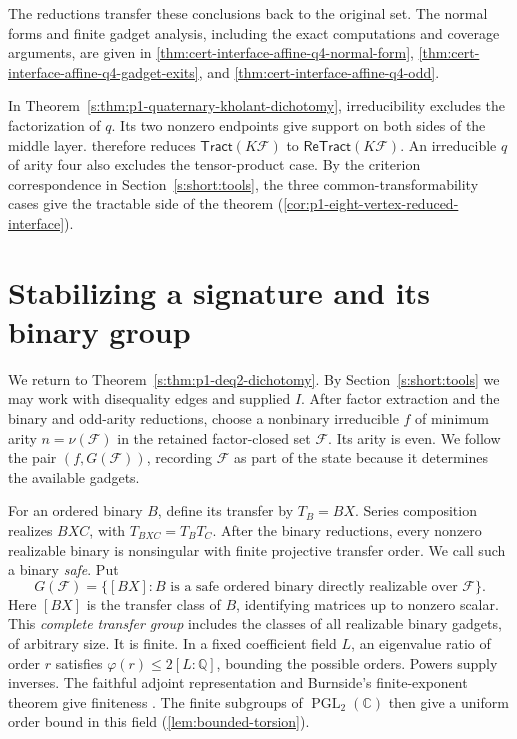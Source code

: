 \documentclass[11pt,letterpaper,onecolumn]{article}
\theoremstyle{plain}
\theoremstyle{definition}
\theoremstyle{remark}
\newcommand{\cF}{\mathcal F}
\newcommand{\Tract}{\mathsf{Tract}}
\newcommand{\ReTract}{\mathsf{ReTract}}
\newcommand{\PGL}{\operatorname{PGL}}
\begin{document}
The reductions transfer these conclusions back to the original set. The normal forms and finite gadget analysis,
including the exact computations and coverage arguments, are given in
\cref{thm:cert-interface-affine-q4-normal-form},
\cref{thm:cert-interface-affine-q4-gadget-exits}, and
\cref{thm:cert-interface-affine-q4-odd}.

In Theorem~\ref{s:thm:p1-quaternary-kholant-dichotomy}, irreducibility
excludes the factorization of \(q\). Its two nonzero endpoints give
support on both sides of the middle layer.  therefore reduces \(\Tract(K\cF)\) to
\(\ReTract(K\cF)\). An irreducible \(q\) of arity four also excludes
the tensor-product case. By the criterion correspondence in
Section~\ref{s:short:tools}, the three common-transformability cases give
the tractable side of the theorem (\cref{cor:p1-eight-vertex-reduced-interface}).

\section{Stabilizing a signature and its binary group}
\label{s:short:deck}
We return to Theorem~\ref{s:thm:p1-deq2-dichotomy}. By
Section~\ref{s:short:tools} we may work with disequality edges and
supplied \(I\). After factor extraction and the binary and odd-arity
reductions, choose a nonbinary irreducible \(f\) of minimum
arity \(n=\nu(\cF)\) in the retained factor-closed set \(\cF\).
Its arity is even. We follow the pair \((f,G(\cF))\), recording
\(\cF\) as part of the state because it determines the available gadgets.

For an ordered binary \(B\), define its transfer by \(T_B=BX\).
Series composition realizes \(BXC\), with \(T_{BXC}=T_BT_C\).
After the binary reductions, every nonzero realizable binary is
nonsingular with finite projective transfer order. We call such a binary
\emph{safe}. Put
\[
 G(\cF)=\{[BX]:B\text{ is a safe ordered binary directly realizable over }\cF\}.
\]
Here \([BX]\) is the transfer class of \(B\), identifying matrices
up to nonzero scalar. This \emph{complete transfer group} includes the
classes of all realizable binary gadgets, of arbitrary size.
It is finite. In a fixed coefficient field \(L\), an eigenvalue ratio
of order \(r\) satisfies \(\varphi(r)\le2[L:\mathbb Q]\), bounding
the possible orders. Powers supply inverses. The faithful adjoint
representation and Burnside's finite-exponent theorem give finiteness
\cite{Burnside1905}. The finite subgroups of \(\PGL_2(\mathbb C)\)
then give a uniform order bound in this field (\cref{lem:bounded-torsion}).
\end{document}

